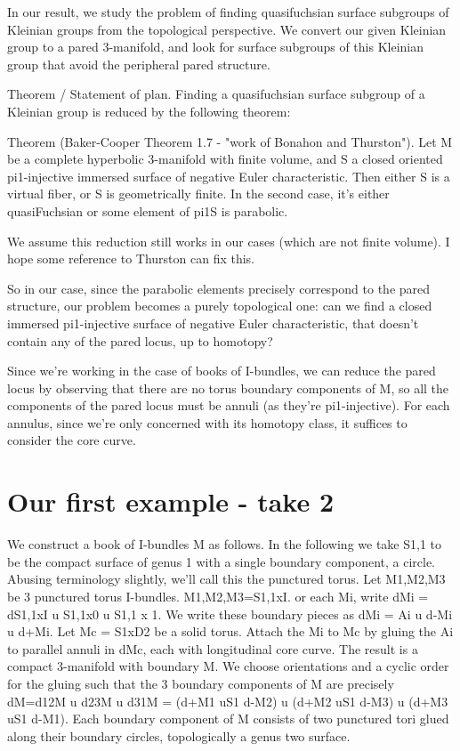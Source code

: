 \documentclass[12pt]{amsart}
\theoremstyle{definition}
\begin{document}
In our result, we study the problem of finding quasifuchsian surface subgroups
of Kleinian groups from the topological perspective. We convert our given
Kleinian group to a pared 3-manifold, and look for surface subgroups of this
Kleinian group that avoid the peripheral pared structure.

Theorem / Statement of plan. Finding a quasifuchsian surface subgroup of
a Kleinian group is reduced by the following theorem:

Theorem (Baker-Cooper Theorem 1.7 - "work of Bonahon and Thurston"). Let M be
a complete hyperbolic 3-manifold with finite volume, and S a closed oriented
pi1-injective immersed surface of negative Euler characteristic. Then either
S is a virtual fiber, or S is geometrically finite. In the second case, it's
either quasiFuchsian or some element of pi1S is parabolic.

We assume this reduction still works in our cases (which are not finite
volume). I hope some reference to Thurston can fix this.

So in our case, since the parabolic elements precisely correspond to the pared
structure, our problem becomes a purely topological one: can we find a
closed immersed pi1-injective surface of negative Euler characteristic, that
doesn't contain any of the pared locus, up to homotopy?

Since we're working in the case of books of I-bundles, we can reduce the pared
locus by observing that there are no torus boundary components of M, so all the
components of the pared locus must be annuli (as they're pi1-injective). For
each annulus, since we're only concerned with its homotopy class, it suffices
to consider the core curve.

\section{Our first example - take 2}

We construct a book of I-bundles M as follows. In the following we take S1,1 to
be the compact surface of genus 1 with a single boundary component, a circle.
Abusing terminology slightly, we'll call this the punctured torus.
Let M1,M2,M3 be 3 punctured
torus I-bundles. M1,M2,M3=S1,1xI. or each Mi, write dMi = dS1,1xI u S1,1x0
u S1,1 x 1. We write these boundary pieces as dMi = Ai u d-Mi u d+Mi. Let Mc
= S1xD2 be a solid torus. Attach the Mi to Mc by gluing the Ai to parallel
annuli in dMc, each with longitudinal core curve. The result is a compact
3-manifold with boundary M. We choose orientations and a cyclic order for the
gluing such that the 3 boundary components of M are precisely
dM=d12M u d23M u d31M = (d+M1 uS1 d-M2) u (d+M2 uS1 d-M3) u (d+M3 uS1 d-M1).
Each boundary component of M consists of two punctured tori glued along their
boundary circles, topologically a genus two surface.
\end{document}
